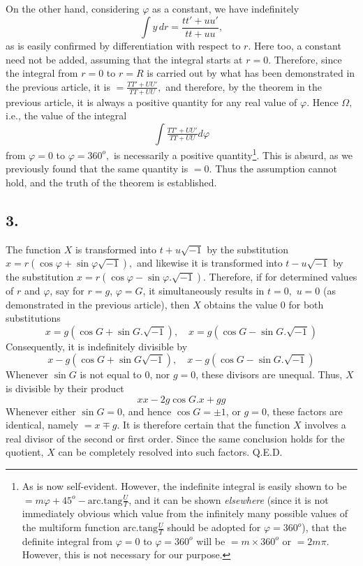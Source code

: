\documentclass[14pt]{memoir}
\theoremstyle{plain}
\theoremstyle{remark}
\begin{document}
On the other hand, considering \(\varphi\) as a constant, we have indefinitely
\[\int y \,dr = \frac{tt'+uu'}{tt+uu},\]
as is easily confirmed by differentiation with respect to \(r\). Here too, a constant need not be added, assuming that the integral starts at \(r=0\). Therefore, since the integral from \(r=0\) to \(r=R\) is carried out by what has been demonstrated in the previous article, it is \(=\frac{TT'+UU'}{TT+UU},\) and therefore, by the theorem in the previous article, it is always a positive quantity for any real value of \(\varphi\). Hence \(\Omega,\) i.e., the value of the integral
\[\int\tfrac{TT'+UU'}{TT+UU}d\varphi\]
from \(\varphi=0\) to \(\varphi=360^o,\) is necessarily a positive quantity\footnote{As is now self-evident. However, the indefinite integral is easily shown to be \(= m\varphi+45^o-\mathrm{arc.tang}\tfrac{U}{T}\), and it can be shown \textit{elsewhere} (since it is not immediately obvious which value from the infinitely many possible values of the multiform function \(\mathrm{arc.tang}\tfrac{U}{T}\) should be adopted for \(\varphi=360^o\)), that the definite integral from \(\varphi=0\) to \(\varphi=360^o\) will be \(=m\times360^o\) or \(=2 m\pi\). However, this is not necessary for our purpose.}. This is absurd, as we previously found that the same quantity is \(=0.\) Thus the assumption cannot hold, and the truth of the theorem is established.

\subsection*{3.}

The function \(X\) is transformed into \(t+u\sqrt{-1}\) by the substitution \(x = r(\cos\varphi + \sin\varphi \sqrt{-1}),\) and likewise it is transformed into \(t-u\sqrt{-1}\) by the substitution \(x=r(\cos\varphi-\sin\varphi.\sqrt{-1}).\)  Therefore, if for determined values of \(r\) and \(\varphi\), say for \(r=g\), \(\varphi=G\), it simultaneously results in \(t=0,\) \(u=0\) (as demonstrated in the previous article), then \(X\) obtains the value \(0\) for both substitutions
\[ x=g(\cos G+\sin G.\sqrt{-1}),\quad x=g(\cos G - \sin G.\sqrt{-1})\]
Consequently, it is indefinitely divisible by
\[ x-g(\cos G+\sin G\sqrt{-1}),\quad x-g(\cos G - \sin G.\sqrt{-1})\]
Whenever \(\sin G\) is not equal to 0, nor \(g=0\), these divisors are unequal. Thus, \(X\) is divisible by their product
\[xx-2g\cos G .x+gg\]
Whenever either \(\sin G =0\), and hence \(\cos G=\pm1\), or \(g=0\), these factors are identical, namely \(=x\mp g\). It is therefore certain that the function \(X\) involves a real divisor of the second or first order. Since the same conclusion holds for the quotient, \(X\) can be completely resolved into such factors. Q.E.D.
\end{document}
